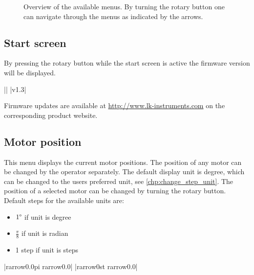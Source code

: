 \begin{figure}[H]
\caption[Overview of the available menus.]{Overview of the available menus. By turning
the rotary button one can navigate through the menus as indicated by the arrows.}
\label{main_menu}
\end{figure}

\FloatBarrier



\subsection{Start screen}
By pressing the rotary button while the start screen is active the
firmware version will be displayed.
\begin{center}
  ||
             |v1.3|
\end{center}
Firmware updates are available at \url{http://www.lk-instruments.com} on
the corresponding product website.

\subsection{Motor position}
\label{menu_motor_pos}
This menu displays the current motor positions. The position of any motor can be
changed by the operator separately. The default display unit is degree, which
can be changed to the users preferred unit, see \ref{chp:change_step_unit}. The
position of a selected motor can be changed by turning the rotary
button. Default steps for the available units are:
\begin{itemize}
\item $1\degree$ if unit is degree
\item $\frac{\pi}{8}$ if unit is radian
\item 1 step if unit is steps
\end{itemize}
\begin{center}
  |{rarrow}0.0{pi}   {rarrow}0.0|
             |{rarrow}0st    {rarrow}0.0|
\end{center}


